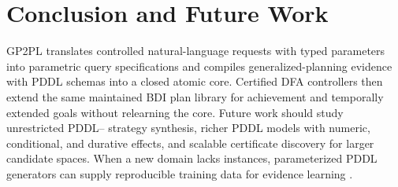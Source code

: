 \section{Conclusion and Future Work}

GP2PL translates controlled natural-language requests with typed parameters
into parametric \ltlf{} query specifications and compiles generalized-planning
evidence with PDDL schemas into a closed atomic core. Certified DFA controllers
then extend the same maintained BDI plan library for achievement and temporally
extended goals without relearning the core.
Future work should study unrestricted PDDL--\ltlf{} strategy synthesis, richer
PDDL models with numeric, conditional, and durative effects, and scalable
certificate discovery for larger candidate spaces.
When a new domain lacks instances, parameterized PDDL generators can supply
reproducible training data for evidence learning \cite{Bacchus2001AIPS00}.
